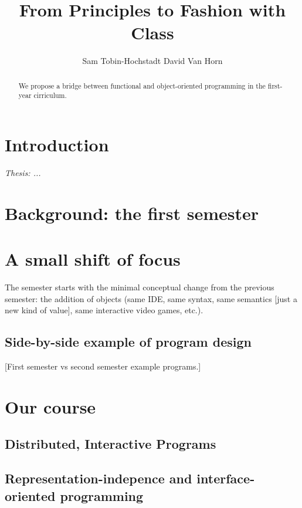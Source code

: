 \documentclass[submission,copyright]{eptcs}
\title{From Principles to Fashion with Class}
\author{Sam Tobin-Hochstadt \quad\qquad David Van Horn
\institute{Northeastern University\\
Boston, Massachusetts, USA}
\email{\{samth,dvanhorn\}@ccs.neu.edu}
}
\begin{document}
\maketitle

\begin{abstract}
We propose a bridge between functional and object-oriented programming
in the first-year cirriculum.
\end{abstract}

\section{Introduction}

\emph{Thesis: ...}

\section{Background: the first semester}

\cite{dvanhorn:Felleisen2004Structure}

\cite{dvanhorn:Findler2002DrScheme}

\cite{dvanhorn:Felleisen2001How}

\section{A small shift of focus}

The semester starts with the minimal conceptual change from the
previous semester: the addition of objects (same IDE, same syntax,
same semantics [just a new kind of value], same interactive video
games, etc.).

\subsection{Side-by-side example of program design}

[First semester vs second semester example programs.]

\section{Our course}

\subsection{Distributed, Interactive Programs}

\subsection{Representation-indepence and interface-oriented programming}
\end{document}
